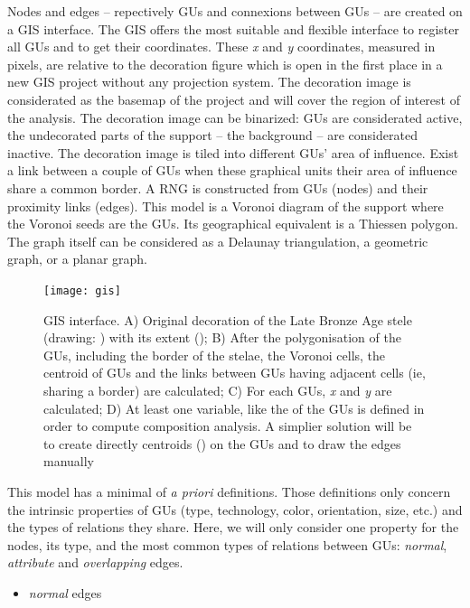 \documentclass[article]{jss}\usepackage{knitr}
\begin{document}
Nodes and edges -- repectively GUs and connexions between GUs -- are created on a GIS interface. The GIS offers the most suitable and flexible interface to register all GUs and to get their coordinates. These \emph{x} and \emph{y} coordinates, measured in pixels, are relative to the decoration figure which is open in the first place in a new GIS project without any projection system. The decoration image is considerated as the basemap of the project and will cover the region of interest of the analysis. The decoration image can be binarized: GUs are considerated active, the undecorated parts of the support -- the background -- are considerated inactive. The decoration image is tiled into different GUs' area of influence.
Exist a link between a couple of GUs when these graphical units their area of influence share a common border. A RNG is constructed from GUs (nodes) and their proximity links (edges). This model is a Voronoi diagram of the support where the Voronoi seeds are the GUs. Its geographical equivalent is a Thiessen polygon. The graph itself can be considered as a Delaunay triangulation, a geometric graph, or a planar graph.

\begin{figure}[H]
\centering
\texttt{[image: gis]}
\caption{\label{fig:gis} GIS interface. A) Original decoration of the Late Bronze Age  stele (drawing: \cite{DiazGuardamino10}) with its extent (); B) After the polygonisation of the GUs, including the border of the stelae, the Voronoi cells, the centroid of GUs and the links between GUs having adjacent cells (ie, sharing a border) are calculated; C) For each GUs, \emph{x} and \emph{y} are calculated; D) At least one variable, like the  of the GUs is defined in order to compute composition analysis. A simplier solution will be to create directly centroids () on the GUs and to draw the edges manually}
\end{figure}

This model has a minimal of \emph{a priori} definitions. Those definitions only concern the intrinsic properties of GUs (type, technology, color, orientation, size, etc.) and the types of relations they share. Here, we will only consider one property for the nodes, its type, and the most common types of relations between GUs: \emph{normal}, \emph{attribute} and \emph{overlapping} edges.

\begin{itemize}
  \item \emph{normal} edges
\end{itemize}
\end{document}
